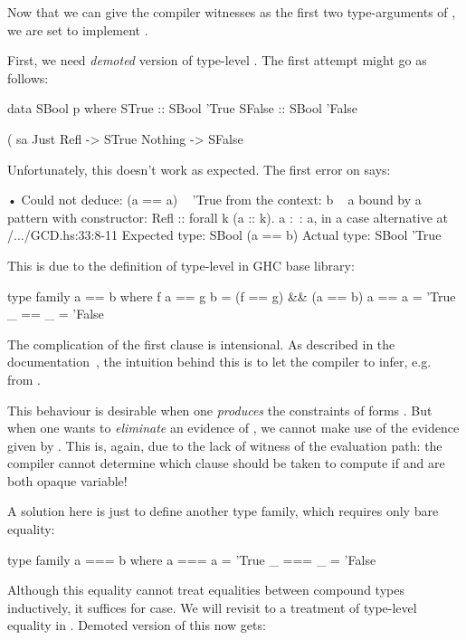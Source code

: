 \documentclass[demotion-paper.tex]{subfiles}
\begin{document}
Now that we can give the compiler witnesses as the first two type-arguments of , we are set to implement .

First, we need \emph{demoted} version of type-level \hask{(==)}.
The first attempt might go as follows:
\begin{code}
data SBool p where
  STrue  :: SBool 'True
  SFalse :: SBool 'False

(%
sa %
  Just Refl -> STrue
  Nothing -> SFalse
\end{code}
Unfortunately, this doesn't work as expected.
The first error on  says:

\begin{repl}
• Could not deduce: (a == a) ~ 'True
  from the context: b ~ a
    bound by a pattern with constructor:
               Refl :: forall k (a :: k). a :~: a,
             in a case alternative
    at /.../GCD.hs:33:8-11
  Expected type: SBool (a == b)
    Actual type: SBool 'True
\end{repl}

This is due to the definition of type-level \hask{(==)} in GHC base library:

\begin{code}
type family a == b where
  f a == g b = (f == g) && (a == b)
  a   == a   = 'True
  _   == _   = 'False
\end{code}

The complication of the first clause is intensional.
As described in the documentation~\cite{GHC-Team:2021aa}, the intuition behind this is to let the compiler to infer, e.g.\  from .

This behaviour is desirable when one \emph{produces} the constraints of forms .
But when one wants to \emph{eliminate} an evidence of , we cannot make use of the evidence given by .
This is, again, due to the lack of witness of the evaluation path: the compiler cannot determine which clause should be taken to compute  if  and  are both opaque variable!

A solution here is just to define another type family, which requires only bare equality:
\begin{code}
type family a === b where
  a === a = 'True
  _ === _ = 'False
\end{code}

Although this equality cannot treat equalities between compound types inductively, it suffices for  case.
We will revisit to a treatment of type-level equality in .
Demoted version of this now gets:
\end{document}
